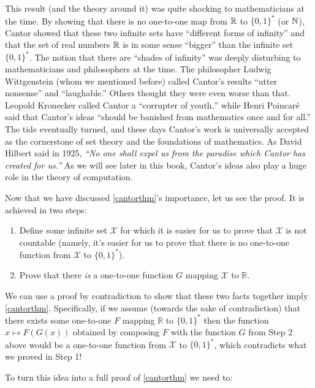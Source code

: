 This result (and the theory around it) was quite shocking to
mathematicians at the time. By showing that there is no one-to-one map
from \({\mathbb{R}}\) to \(\{0,1\}^*\) (or \({\mathbb{N}}\)), Cantor showed that these two
infinite sets have ``different forms of infinity'' and that the set of
real numbers \({\mathbb{R}}\) is in some sense ``bigger'' than the infinite set
\(\{0,1\}^*\). The notion that there are ``shades of infinity'' was
deeply disturbing to mathematicians and philosophers at the time. The
philosopher Ludwig Wittgenstein (whom we mentioned before) called
Cantor's results ``utter nonsense'' and ``laughable.'' Others thought
they were even worse than that. Leopold Kronecker called Cantor a
``corrupter of youth,'' while Henri Poincaré said that Cantor's ideas
``should be banished from mathematics once and for all.'' The tide
eventually turned, and these days Cantor's work is universally accepted
as the cornerstone of set theory and the foundations of mathematics. As
David Hilbert said in 1925, \emph{``No one shall expel us from the
paradise which Cantor has created for us.''} As we will see later in
this book, Cantor's ideas also play a huge role in the theory of
computation.

Now that we have discussed \cref{cantorthm}'s importance, let us see the
proof. It is achieved in two steps:

\begin{enumerate}
\def\labelenumi{\arabic{enumi}.}
\item
  Define some infinite set \(\mathcal{X}\) for which it is easier for us
  to prove that \(\mathcal{X}\) is not countable (namely, it's easier
  for us to prove that there is no one-to-one function from
  \(\mathcal{X}\) to \(\{0,1\}^*\)).
\item
  Prove that there \emph{is} a one-to-one function \(G\) mapping
  \(\mathcal{X}\) to \(\mathbb{R}\).
\end{enumerate}

We can use a proof by contradiction to show that these two facts
together imply \cref{cantorthm}. Specifically, if we assume (towards the
sake of contradiction) that there exists some one-to-one \(F\) mapping
\(\mathbb{R}\) to \(\{0,1\}^*\) then the function \(x \mapsto F(G(x))\)
obtained by composing \(F\) with the function \(G\) from Step 2 above
would be a one-to-one function from \(\mathcal{X}\) to \(\{0,1\}^*\),
which contradicts what we proved in Step 1!

To turn this idea into a full proof of \cref{cantorthm} we need to:


